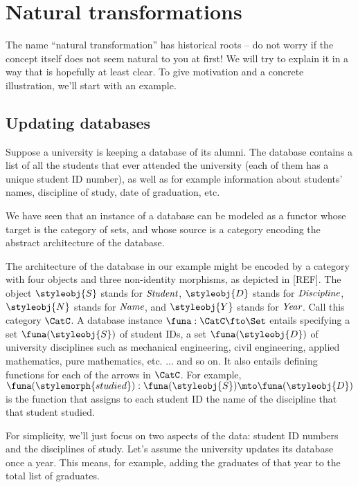 
\section{Natural transformations}


The name ``natural transformation'' has historical roots -- do not worry if the concept itself does not seem natural to you at first! We will try to explain it in a way that is hopefully at least clear. To give motivation and a concrete illustration, we'll start with an example. 

\subsection{Updating databases}

Suppose a university is keeping a database of its alumni. The database contains a list of all the students that ever attended the university (each of them has a unique student ID number), as well as for example information about students' names, discipline of study, date of graduation, etc. 

We have seen that an instance of a database can be modeled as a functor whose target is the category of sets, and whose source is a category encoding the abstract architecture of the database. 

The architecture of the database in our example might be encoded by a category with four objects and three non-identity morphisms, as depicted in [REF]. The object $\styleobj{S}$ stands for $\emph{Student}$, $\styleobj{D}$ stands for $\emph{Discipline}$, $\styleobj{N}$ stands for $\emph{Name}$, and $\styleobj{Y}$ stands for $\emph{Year}$. Call this category $\CatC$. A database instance $\funa : \CatC \fto \Set$ entails specifying a set $\funa(\styleobj{S})$ of student IDs, a set $\funa(\styleobj{D})$ of university disciplines such as mechanical engineering, civil engineering, applied mathematics, pure mathematics, etc. ... and so on. It also entails defining functions for each of the arrows in $\CatC$. For example, $\funa(\stylemorph{studied}) : \funa(\styleobj{S}) \mto \funa(\styleobj{D})$ is the function that assigns to each student ID the name of the discipline that that student studied. 


For simplicity, we'll just focus on two aspects of the data: student ID numbers and the disciplines of study. 
Let's assume the university updates its database once a year. This means, for example, adding the graduates of that year to the total list of graduates. 

